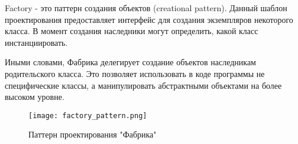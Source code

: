 Factory - это паттерн создания объектов (creational pattern). Данный шаблон проектирования предоставляет интерфейс для создания экземпляров некоторого класса. В момент создания наследники могут определить, какой класс инстанциировать.

Иными словами, Фабрика делегирует создание объектов наследникам родительского класса. Это позволяет использовать в коде программы не специфические классы, а манипулировать абстрактными объектами на более высоком уровне.

\begin{figure}
\centering
    \texttt{[image: factory\_pattern.png]}
    \caption{Паттерн проектирования "Фабрика"}
    \label{sec:analysis:horse}
\end{figure}